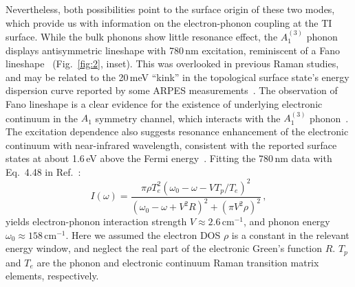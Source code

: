 \documentclass[reprint,aps,pra,superscriptaddress,amsmath,amssymb,linenumbers,longbibliography]{revtex4-1}
\begin{document}
Nevertheless, both possibilities point to the surface origin of these two modes, which provide us with information on the electron-phonon coupling at the TI surface.
While the bulk phonons show little resonance effect, the $A_{1}^{(3)}$ phonon displays antisymmetric lineshape with 780\,nm excitation, reminiscent of a Fano lineshape~\cite{Fano1961} (Fig.~\ref{fig:2}, inset).
This was overlooked in previous Raman studies, and may be related to the 20\,meV ``kink'' in the topological surface state's energy dispersion curve reported by some ARPES measurements~\cite{Kondo2013,Chen2013}.
The observation of Fano lineshape is a clear evidence for the existence of underlying electronic continuum in the $A_1$ symmetry channel, which interacts with the $A_{1}^{(3)}$ phonon~\cite{Fano1961,Klein1983}.
The excitation dependence also suggests resonance enhancement of the electronic continuum with near-infrared wavelength, consistent with the reported surface states at about 1.6\,eV above the Fermi energy~\cite{Sobota2013,Niesner2012}.
Fitting the 780\,nm data with Eq.~4.48 in Ref.~\cite{Klein1983}:
\begin{equation}\label{eq:Fano}
I(\omega)=\frac{\pi\rho T_e^2(\omega_0-\omega-V T_p/T_e)^2}{(\omega_0-\omega+V^2 R)^2+(\pi V^2 \rho)^2}\,,
\end{equation}
yields electron-phonon interaction strength $V\approx 2.6$\,cm$^{-1}$, and phonon energy $\omega_0\approx 158$\,cm$^{-1}$.
Here we assumed the electron DOS $\rho$ is a constant in the relevant energy window, and neglect the real part of the electronic Green's function $R$.
$T_p$ and $T_e$ are the phonon and electronic continuum Raman transition matrix elements, respectively.
\end{document}
